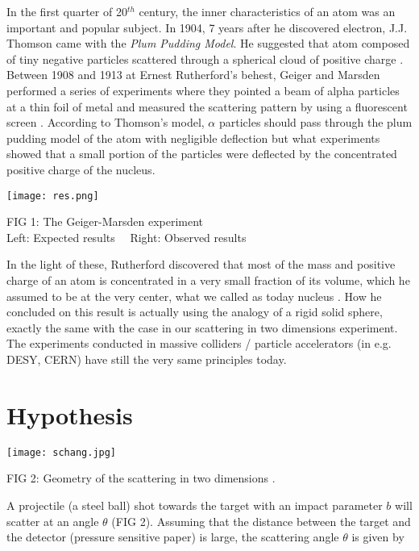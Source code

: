 \documentclass[a4paper]{article}
\begin{document}
\begin{multicols}{2}
In the first quarter of 20$^{th}$ century, the inner characteristics of an atom was an important and popular subject. In 1904, 7 years after he discovered electron,  J.J. Thomson came with the \textit{Plum Pudding Model}. He suggested that atom composed of tiny negative particles scattered through a spherical cloud of positive charge \cite{thom}. Between 1908 and 1913 at Ernest Rutherford's behest, Geiger and Marsden performed a series of experiments where they pointed a beam of alpha particles at a thin foil of metal and measured the scattering pattern by using a fluorescent screen \cite{gm}. According to Thomson's model,  $\alpha$ particles should pass through the plum pudding model of the atom with negligible deflection but what experiments showed that a small portion of the particles were deflected by the concentrated positive charge of the nucleus.

\begin{center}

\texttt{[image: res.png]}

FIG 1: The Geiger-Marsden experiment \cite{res} \\
Left: Expected results \ \ Right: Observed results
\end{center}

In the light of these, Rutherford discovered that most of the mass and positive charge of an atom is concentrated in a very small fraction of its volume, which he assumed to be at the very center, what we called as today nucleus \cite{rf}. How he concluded on this result is actually using the analogy of a rigid solid sphere, exactly the same with the case in our scattering in two dimensions experiment. The experiments conducted in massive colliders / particle accelerators (in e.g. DESY, CERN) have still the very same principles today.

 

\section{Hypothesis}

\begin{center}

\texttt{[image: schang.jpg]}

FIG 2: Geometry of the scattering in two dimensions \cite{gulmez}.

\end{center}

A projectile (a steel ball) shot towards the target with an impact parameter $b$ will scatter at an angle $\theta$ (FIG 2). Assuming that the distance between the target and the detector (pressure sensitive paper) is large, the scattering angle $\theta$ is given by \cite{gulmez} 


\end{multicols}
\end{document}
